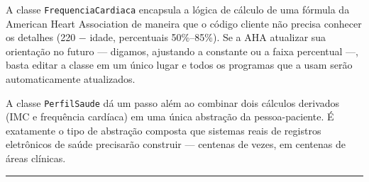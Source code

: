 \documentclass[11pt,a4paper]{article}
\begin{document}
A classe \texttt{FrequenciaCardiaca} encapsula a l\'ogica de c\'alculo de uma f\'ormula da American Heart Association de maneira que o c\'odigo cliente n\~ao precisa conhecer os detalhes (220 $-$ idade, percentuais 50\%--85\%). Se a AHA atualizar sua orienta\c{c}\~ao no futuro --- digamos, ajustando a constante ou a faixa percentual ---, basta editar a classe em um \'unico lugar e todos os programas que a usam ser\~ao automaticamente atualizados.

A classe \texttt{PerfilSaude} d\'a um passo al\'em ao combinar dois c\'alculos derivados (IMC e frequ\^encia card\'iaca) em uma \'unica abstra\c{c}\~ao da pessoa-paciente. \'E exatamente o tipo de abstra\c{c}\~ao composta que sistemas reais de registros eletr\^onicos de sa\'ude precisar\~ao construir --- centenas de vezes, em centenas de \'areas cl\'inicas.

\vspace{1em}
\begin{center}\rule{0.5\textwidth}{0.4pt}\end{center}
\end{document}
